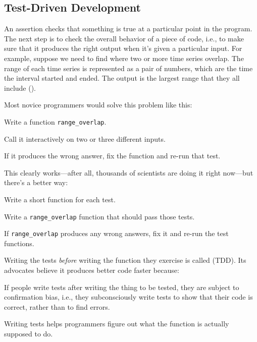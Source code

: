 \subsection{Test-Driven Development}

An assertion checks that something is true at a particular point in the
program. The next step is to check the overall behavior of a piece of
code, i.e., to make sure that it produces the right output when it's
given a particular input. For example, suppose we need to find where two
or more time series overlap. The range of each time series is
represented as a pair of numbers, which are the time the interval
started and ended. The output is the largest range that they all
include ().


Most novice programmers would solve this problem like this:

\begin{swcenumerate}
\item
  Write a function \texttt{range\_overlap}.
\item
  Call it interactively on two or three different inputs.
\item
  If it produces the wrong answer, fix the function and re-run that
  test.
\end{swcenumerate}

This clearly works---after all, thousands of scientists are doing it
right now---but there's a better way:

\begin{swcenumerate}
\item
  Write a short function for each test.
\item
  Write a \texttt{range\_overlap} function that should pass those tests.
\item
  If \texttt{range\_overlap} produces any wrong answers, fix it and
  re-run the test functions.
\end{swcenumerate}

Writing the tests \emph{before} writing the function they exercise is
called 
(TDD). Its advocates believe it produces better code faster because:

\begin{swcenumerate}
\item
  If people write tests after writing the thing to be tested, they are
  subject to confirmation bias, i.e., they subconsciously write tests to
  show that their code is correct, rather than to find errors.
\item
  Writing tests helps programmers figure out what the function is
  actually supposed to do.
\end{swcenumerate}

